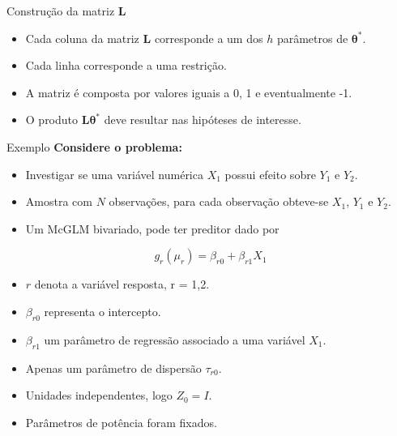 \documentclass[
  ignorenonframetext,
  serif,
  professionalfont,
  usenames,
  dvipsnames,
  aspectratio = 169]{beamer}
\def\endColumns{\end{minipage}}%
\def\beginAHalfColumnT{\begin{minipage}[t]{0.49\textwidth}}%
\begin{document}
\begin{frame}{Construção da matriz \(\boldsymbol{L}\)}
\protect\hypertarget{construuxe7uxe3o-da-matriz-boldsymboll}{}
\begin{itemize}
  \itemsep 2ex
  
  \item Cada coluna da matriz $\boldsymbol{L}$ corresponde a um dos $h$ parâmetros de $\boldsymbol{\theta^{*}}$. 
  
  \item Cada linha corresponde a uma restrição. 

  \item A matriz é composta por valores iguais a 0, 1 e eventualmente -1.
  
  \item O produto $\boldsymbol{L}\boldsymbol{\theta^{*}}$ deve resultar nas hipóteses de interesse.

\end{itemize}
\end{frame}

\begin{frame}{Exemplo}
\protect\hypertarget{exemplo}{}
\textbf{Considere o problema:}

\begin{itemize}
  
  \item Investigar se uma variável numérica $X_1$ possui efeito sobre $Y_1$ e $Y_2$. 
  
  \item Amostra com $N$ observações, para cada observação obteve-se $X_1$, $Y_1$ e $Y_2$.

  \item Um McGLM bivariado, pode ter preditor dado por

\end{itemize}

\[
g_r(\mu_r) = \beta_{r0} + \beta_{r1} X_1
\]

\beginAHalfColumnT
  \begin{itemize}
    \itemsep 1ex
    \item $r$ denota a variável resposta, r = 1,2.
    \item $\beta_{r0}$ representa o intercepto.
    \item $\beta_{r1}$ um parâmetro de regressão associado a uma variável $X_1$. 
  \end{itemize}  
\endColumns
\beginAHalfColumnT

\begin{itemize}
    \itemsep 1ex
    \item Apenas um parâmetro de dispersão $\tau_{r0}$.
    \item Unidades independentes, logo $Z_0 = I$.
    \item Parâmetros de potência foram fixados.
  \end{itemize}

\endColumns
\end{frame}
\end{document}
